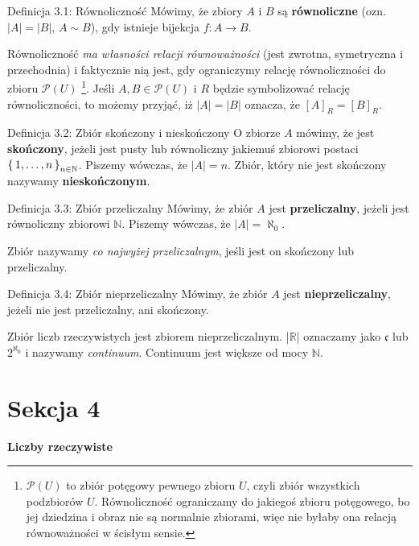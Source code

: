 \documentclass{article}
\newcommand{\R}{\mathbb{R}}
\newcommand{\N}{\mathbb{N}}
\newcommand{\Po}{\mathcal{P}}
\begin{document}
\begin{defr}{Definicja 3.1: Równoliczność}
    Mówimy, że zbiory $A$ i $B$ są \textbf{równoliczne} (ozn. $|A|=|B|$, $A\sim B$),
    gdy istnieje bijekcja $f:A\to B$.
\end{defr}

Równoliczność \textit{ma własności relacji równoważności} 
(jest zwrotna, symetryczna i przechodnia)
i faktycznie nią jest, gdy ograniczymy relację równoliczności do zbioru $\Po(U)$
\footnote{$\Po(U)$ to zbiór potęgowy pewnego zbioru $U$, czyli zbiór wszystkich
podzbiorów $U$. Równoliczność ograniczamy do jakiegoś
zbioru potęgowego, bo jej dziedzina i obraz nie są normalnie zbiorami,
 więc nie byłaby ona relacją równoważności w ścisłym sensie.}. 
 Jeśli $A, B\in \Po(U)$ i $R$ będzie symbolizować relację równoliczności, 
 to możemy przyjąć, iż $|A|=|B|$ oznacza, że
$[A]_R=[B]_R$.

\begin{defr}{Definicja 3.2: Zbiór skończony i nieskończony}
    O zbiorze $A$ mówimy, że jest \textbf{skończony}, jeżeli jest pusty lub równoliczny
    jakiemuś zbiorowi postaci $\set{1,\ldots,n}_{n\in\N}$. Piszemy wówczas, że $|A|=n$.
    Zbiór, który nie jest skończony nazywamy \textbf{nieskończonym}.
\end{defr}

\begin{defr}{Definicja 3.3: Zbiór przeliczalny}
    Mówimy, że zbiór $A$ jest \textbf{przeliczalny}, jeżeli jest równoliczny zbiorowi
    $\N$. Piszemy wówczas, że $|A|=\aleph_0$. 
\end{defr}

Zbiór nazywamy \textit{co najwyżej przeliczalnym}, jeśli jest on skończony lub przeliczalny.

\begin{defr}{Definicja 3.4: Zbiór nieprzeliczalny}
    Mówimy, że zbiór $A$ jest \textbf{nieprzeliczalny}, jeżeli nie jest przeliczalny,
    ani skończony.
\end{defr}

Zbiór liczb rzeczywistych jest zbiorem nieprzeliczalnym. |$\R$| oznaczamy 
jako $\mathfrak{c}$ lub $2^{\aleph_0}$ i nazywamy \textit{continuum}. Continuum jest
większe od mocy $\N$.

\newpage


                                \section*{Sekcja 4} \smallskip
                                {\Huge\bfseries Liczby rzeczywiste} \bigskip \medskip
\end{document}
